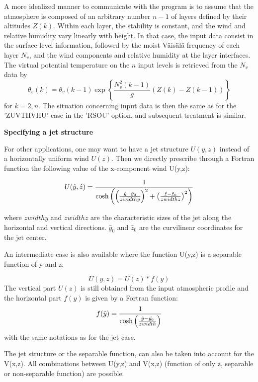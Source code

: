 A more idealized manner to communicate with the program is to assume that
the atmosphere is composed of an arbitrary number $n-1$ of layers defined
by their altitudes $Z(k)$. Within each layer,
the stability is constant, and the wind and relative humidity vary linearly
with height. In that case, the input data consist in the surface level
information, followed by the moist V\"ais\"al\"a frequency of each layer
$N_v$, and the wind components and relative humidity at the layer
interfaces.
The virtual potential temperature on the $n$ input levels is retrieved
from the $N_{v}$ data by
\begin{equation}
\theta_{v}(k)  = \theta_{v}(k-1) \exp\left\{ \dfrac{N_{v}^{2}(k-1)}{g}
\left( Z(k)-Z(k-1) \right) \right\}
\end{equation}
for $k=2,n$. The situation concerning input data is then the same as for
the 'ZUVTHVHU' case in the 'RSOU' option, and subsequent treatment is similar.

{\bf Specifying a jet structure}

For other applications, one may want to have a jet structure $U(y,z)$ instead
of a horizontally uniform wind $U(z)$. Then we directly prescribe through
a Fortran function the following  value of the x-component wind U(y,z):

\begin{equation}
U(\hat{y},\hat{z})= { 1 \over \cosh \left(
  \left( { \hat{y} - \hat{y}_0 \over zwidthy } \right) ^2 +
  \left( { \hat{z} - \hat{z}_0 \over zwidthz } \right) ^2
 \right) }
\end{equation}

where $ zwidthy$ and  $ zwidthz $ are the characteristic sizes of the jet along
the horizontal and vertical directions. $\hat{y}_0$ and $\hat{z}_0$ are the
curvilinear coordinates  for the jet center.

An intermediate case is also available where the function U(y,z) is a separable
function of y and z:

$$ U(y,z) = U(z) * f(y)$$
 The vertical part $ U(z)$  is still obtained from the input atmospheric profile and
the horizontal part $f(y)$ is given by a Fortran function:
\begin{equation}
 f(\hat{y}) = { 1 \over \cosh \left(
   { \hat{y} - \hat{y_0} \over zwidth } \right) }
\end{equation}
with the same notations as for the jet case.

The jet structure or the separable function, can also be taken into account for
the V(x,z). All combinations between U(y,z) and V(x,z) (function of only z,
separable or non-separable function) are possible.


